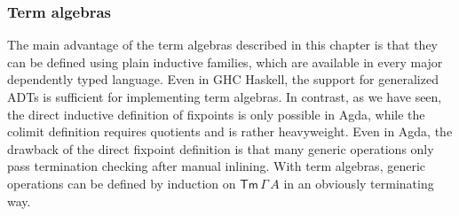 \documentclass[12pt,a4paper,twoside,openany]{book}
\theoremstyle{remark}
\theoremstyle{definition}
\theoremstyle{theorem}
\newcommand{\Tm}{\mathsf{Tm}}
\begin{document}
\subsubsection{Term algebras}
The main advantage of the term algebras described in this chapter is that they
can be defined using plain inductive families, which are available in every
major dependently typed language. Even in GHC Haskell, the support for
generalized ADTs \cite{gadts} is sufficient for implementing term algebras. In
contrast, as we have seen, the direct inductive definition of fixpoints is only
possible in Agda, while the colimit definition requires quotients and is rather
heavyweight. Even in Agda, the drawback of the direct fixpoint definition is
that many generic operations only pass termination checking after manual
inlining. With term algebras, generic operations can be defined by induction on
$\Tm\,\Gamma\,A$ in an obviously terminating way.
\end{document}
